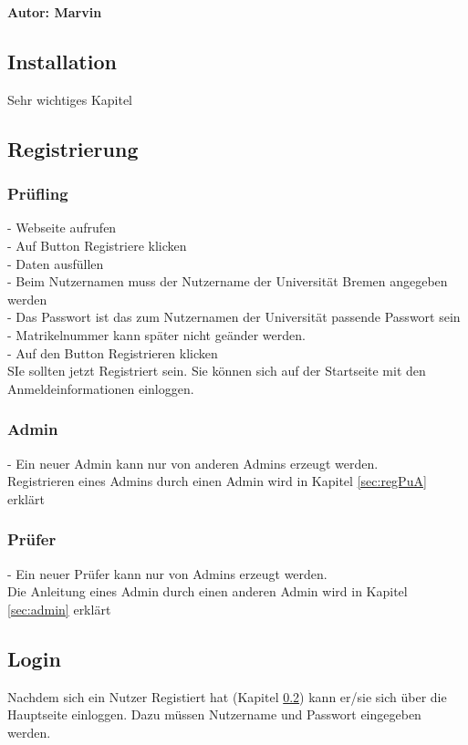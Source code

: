 \textbf{Autor: Marvin}\\
\subsection{Installation}
Sehr wichtiges Kapitel

\subsection{Registrierung}
\label{sec:regristrierung}
\subsubsection{Prüfling} 
- Webseite aufrufen\\
- Auf Button Registriere klicken\\
- Daten ausfüllen\\
	-  Beim Nutzernamen muss der Nutzername der Universität Bremen angegeben werden\\
	- Das Passwort ist das zum Nutzernamen der Universität passende Passwort sein\\
	- Matrikelnummer kann später nicht geänder werden.\\
- Auf den Button Registrieren klicken\\
SIe sollten jetzt Registriert sein. Sie können sich auf der Startseite mit den Anmeldeinformationen einloggen.
\subsubsection{Admin}
- Ein neuer Admin kann nur von anderen Admins erzeugt werden.\\
Registrieren eines Admins durch einen Admin wird in {Kapitel \ref{sec:regPuA}} erklärt
\subsubsection{Prüfer}
- Ein neuer Prüfer kann nur von Admins erzeugt werden.\\
Die Anleitung eines Admin durch einen anderen Admin wird in {Kapitel \ref{sec:admin}} erklärt
\subsection{Login}
Nachdem sich ein Nutzer Registiert hat ({Kapitel \ref{sec:regristrierung}}) kann er/sie sich über die Hauptseite einloggen. Dazu müssen Nutzername und Passwort eingegeben werden.